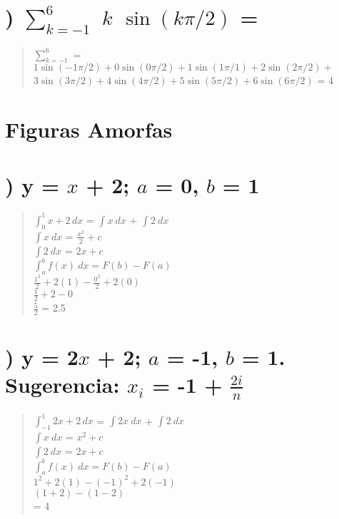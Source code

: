 \documentclass[12pt]{article}
\begin{document}
\fontsize{15}{40}\selectfont
\section*{) $\sum_{k = -1}^{6}$ $k$ $\sin(k\pi/2)$ =} \label{sumatoria:problema_5}


\begin{quote}
  \fontsize{12}{20}\selectfont
  $\sum_{k = -1}^{6} $ = $ 1 \sin(-1\pi/2) + 0 \sin(0\pi/2) + 1 \sin(1\pi/1) + 2 \sin(2\pi/2) +$
  $3 \sin(3\pi/2) + 4 \sin(4\pi/2) + 5 \sin(5\pi/2) + 6 \sin(6\pi/2)$
  = 4
\end{quote}


\newpage

\section*{\fontsize{17}{20}\selectfont Figuras Amorfas}\label{sec:fig_amorfas}

\fontsize{15}{40}\selectfont
\section*{) y = $x$ + 2; $a$ = 0, $b$ = 1} \label{fig_amorfas:problema_1}

\begin{quote}
  \fontsize{14}{30}\selectfont
  $\int_{0}^{1} x + 2 \,dx$ = $\int x\ dx$ + $\int 2\ dx$ \\
  $\int x\ dx $ = $\frac{x^2}{2} + c$ \\
  $\int 2\ dx $ = $2x + c$ \\
  $\int_{a}^{b} f(x)\ dx = F(b) - F(a)$ \\
  $ \frac{1^2}{2} + 2(1)  -  \frac{0^2}{2} + 2(0)$ \\
  $\frac{1}{2} + 2 - 0$ \\
  $\frac{5}{2}$ = 2.5
\end{quote}

\fontsize{15}{40}\selectfont
\section*{) y = 2$x$ + 2; $a$ = -1, $b$ = 1. Sugerencia: $x_i$ = -1 + \fontsize{17}{40}\selectfont $\frac{2i}{n}$} \label{fig_amorfas:problema_2}


\begin{quote}
  \fontsize{14}{30}\selectfont
  $\int_{-1}^{1} 2x + 2 \,dx$ = $\int 2x\ dx$ + $\int 2\ dx$ \\
  $\int x\ dx $ = $x^2 + c$ \\
  $\int 2\ dx $ = $2x + c$ \\
  $\int_{a}^{b} f(x)\ dx = F(b) - F(a)$ \\
  $ 1^2 + 2(1)  -  (-1)^2 + 2(-1)$ \\
  $(1 + 2) - (1 -2) $ \\
  = 4
\end{quote}
\end{document}
